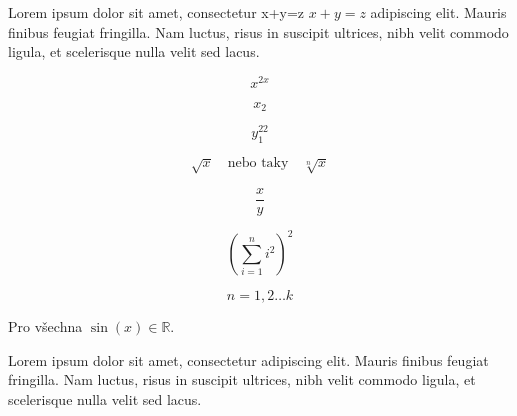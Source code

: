 \documentclass{article}
\begin{document}
Lorem ipsum dolor sit amet, consectetur x+y=z $x+y=z$ adipiscing elit. Mauris finibus feugiat fringilla. Nam luctus, risus in suscipit ultrices, nibh velit commodo ligula, et scelerisque nulla velit sed lacus.

$$ x^{2x} $$

$$ x_2 $$

$$ y_1^{22} $$

$$ \sqrt{x} \quad \text{nebo taky} \quad \sqrt[n]{x} $$

$$ \frac{x}{y} $$

$$ \left( \sum_{i=1}^{n} i^2 \right)^2 $$

$$ n = 1, 2 \dots k $$

Pro všechna $ \sin \left( x \right) \in \mathbb{R} $.

Lorem ipsum dolor sit amet, consectetur adipiscing elit. Mauris finibus feugiat fringilla. Nam luctus, risus in suscipit ultrices, nibh velit commodo ligula, et scelerisque nulla velit sed lacus.
\end{document}
